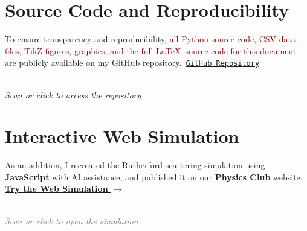 \documentclass[12pt,a4paper,twoside]{article}
\begin{document}
\section{Source Code and Reproducibility}

\begin{mynotebox}
\begin{center}
    \begin{minipage}{0.7\textwidth}
        \centering
        To ensure transparency and reproducibility, \textcolor{darkred}{all Python source code, CSV data files, TikZ figures, graphics, and the full \LaTeX\ source code for this document} are publicly available on my GitHub repository.\
        \href{https://github.com/Maroua-Mezhoud/Physics-Lab-Reports/tree/main/Atomic-physics-Lap-Report/PW1-Rutherford\%20Scattering}{\texttt{GitHub Repository}}
    \end{minipage}%
    \begin{minipage}{0.2\textwidth}
        \centering
    \end{minipage}
    \\[1mm]
    \footnotesize \textit{Scan or click to access the repository}
\end{center}
\end{mynotebox}

\section{Interactive Web Simulation}

\begin{simbox}
\begin{center}
    \begin{minipage}{0.72\textwidth}
        As an addition, I recreated the Rutherford scattering simulation using \textbf{JavaScript} with AI assistance, and published it on our \textbf{Physics Club} website.
        \\[2mm]
        \href{https://maroua-mezhoud.github.io/physics-club/simulations/rutherford-scattering/index.html}{\textcolor{simpink}{\textbf{Try the Web Simulation $\rightarrow$}}}
        
    \end{minipage}%
    \hfill
    \begin{minipage}{0.22\textwidth}
        \centering
    \end{minipage}
    \\[1mm]
    \footnotesize \textit{\textcolor{gray}{Scan or click to open the simulation}}
\end{center}
\end{simbox}



\newpage
\thispagestyle{empty}
\BgThispage
\null

\newpage
\end{document}
